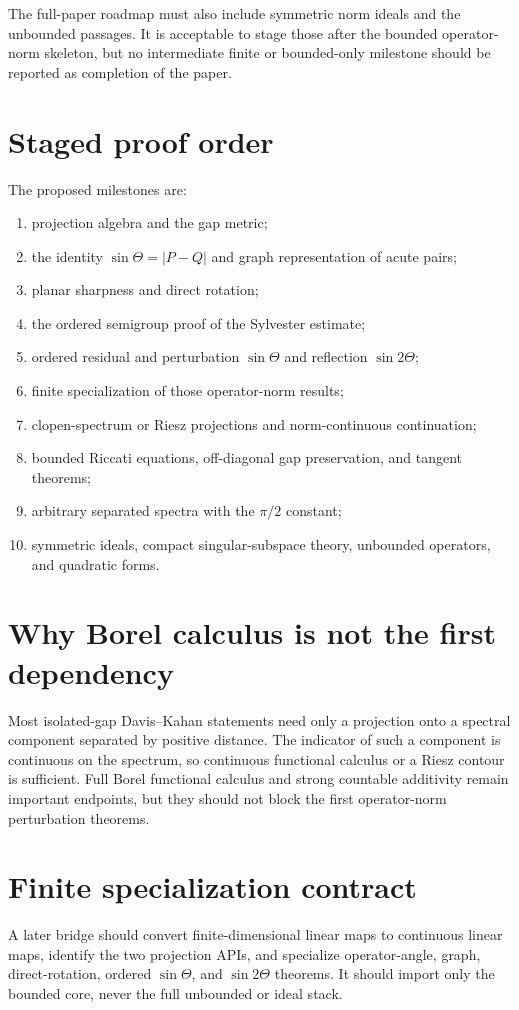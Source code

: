 \documentclass{article}
\begin{document}
The full-paper roadmap must also include symmetric norm ideals and the
unbounded passages. It is acceptable to stage those after the bounded
operator-norm skeleton, but no intermediate finite or bounded-only milestone
should be reported as completion of the paper.

\section{Staged proof order}
The proposed milestones are:
\begin{enumerate}
\item projection algebra and the gap metric;
\item the identity $\sin\Theta=|P-Q|$ and graph representation of acute pairs;
\item planar sharpness and direct rotation;
\item the ordered semigroup proof of the Sylvester estimate;
\item ordered residual and perturbation $\sin\Theta$ and reflection
      $\sin 2\Theta$;
\item finite specialization of those operator-norm results;
\item clopen-spectrum or Riesz projections and norm-continuous continuation;
\item bounded Riccati equations, off-diagonal gap preservation, and tangent
      theorems;
\item arbitrary separated spectra with the $\pi/2$ constant;
\item symmetric ideals, compact singular-subspace theory, unbounded operators,
      and quadratic forms.
\end{enumerate}

\section{Why Borel calculus is not the first dependency}
Most isolated-gap Davis--Kahan statements need only a projection onto a
spectral component separated by positive distance.  The indicator of such a
component is continuous on the spectrum, so continuous functional calculus
or a Riesz contour is sufficient.  Full Borel functional calculus and strong
countable additivity remain important endpoints, but they should not block the
first operator-norm perturbation theorems.

\section{Finite specialization contract}
A later bridge should convert finite-dimensional linear maps to continuous
linear maps, identify the two projection APIs, and specialize operator-angle,
graph, direct-rotation, ordered $\sin\Theta$, and $\sin 2\Theta$ theorems.  It
should import only the bounded core, never the full unbounded or ideal stack.
\end{document}
